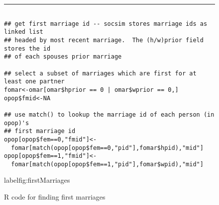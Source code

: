 \begin{figure}[h]
  \centering
\vspace{.25cm}
\rule{.5 \textwidth}{.1mm}
\begin{verbatim}

## get first marriage id -- socsim stores marriage ids as linked list
## headed by most recent marriage.  The (h/w)prior field stores the id
## of each spouses prior marriage

## select a subset of marriages which are first for at least one partner
fomar<-omar[omar$hprior == 0 | omar$wprior == 0,]
opop$fmid<-NA

## use match() to lookup the marriage id of each person (in opop)'s
## first marriage id
opop[opop$fem==0,"fmid"]<-
  fomar[match(opop[opop$fem==0,"pid"],fomar$hpid),"mid"]
opop[opop$fem==1,"fmid"]<-
  fomar[match(opop[opop$fem==1,"pid"],fomar$wpid),"mid"]

\end{verbatim}
  \caption{R code for finding first marriages}
  label{fig:firstMarriages}
\end{figure}



